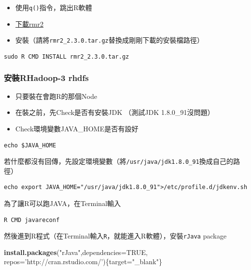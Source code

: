 \documentclass[]{book}
\newenvironment{Shaded}{\begin{snugshade}}{\end{snugshade}}
\newcommand{\KeywordTok}[1]{\textcolor[rgb]{0.13,0.29,0.53}{\textbf{{#1}}}}
\newcommand{\DataTypeTok}[1]{\textcolor[rgb]{0.13,0.29,0.53}{{#1}}}
\newcommand{\StringTok}[1]{\textcolor[rgb]{0.31,0.60,0.02}{{#1}}}
\newcommand{\OtherTok}[1]{\textcolor[rgb]{0.56,0.35,0.01}{{#1}}}
\newcommand{\NormalTok}[1]{{#1}}
\providecommand{\tightlist}{%
  \setlength{\itemsep}{0pt}\setlength{\parskip}{0pt}}
\theoremstyle{definition}
\theoremstyle{definition}
\theoremstyle{remark}
\begin{document}
\begin{itemize}
\tightlist
\item
  使用\texttt{q()}指令，跳出R軟體
\item
  \href{https://github.com/RevolutionAnalytics/RHadoop/wiki/Downloads}{下載rmr2}
\item
  安裝（請將\texttt{rmr2\_2.3.0.tar.gz}替換成剛剛下載的安裝檔路徑）
\end{itemize}

\begin{verbatim}
sudo R CMD INSTALL rmr2_2.3.0.tar.gz
\end{verbatim}

\subsubsection{安裝RHadoop-3 rhdfs}\label{rhadoop-3-rhdfs}

\begin{itemize}
\tightlist
\item
  只要裝在會跑R的那個Node
\item
  在裝之前，先Check是否有安裝JDK （測試JDK 1.8.0\_91沒問題）
\item
  Check環境變數JAVA\_HOME是否有設好
\end{itemize}

\begin{verbatim}
echo $JAVA_HOME
\end{verbatim}

若什麼都沒有回傳，先設定環境變數（將\texttt{/usr/java/jdk1.8.0\_91}換成自己的路徑）

\begin{verbatim}
echo export JAVA_HOME="/usr/java/jdk1.8.0_91">/etc/profile.d/jdkenv.sh
\end{verbatim}

為了讓R可以跑JAVA，在Terminal輸入

\begin{verbatim}
R CMD javareconf
\end{verbatim}

然後進到R程式（在Terminal輸入\texttt{R}，就能進入R軟體），安裝\texttt{rJava}
package

\begin{Shaded}
\begin{Highlighting}[]
\KeywordTok{install.packages}\NormalTok{(}\StringTok{"rJava"}\NormalTok{,}\DataTypeTok{dependencies=}\OtherTok{TRUE}\NormalTok{, }\DataTypeTok{repos=}\StringTok{'http://cran.rstudio.com/'}\NormalTok{)\{target=}\StringTok{"_blank"}\NormalTok{\}}
\end{Highlighting}
\end{Shaded}
\end{document}
